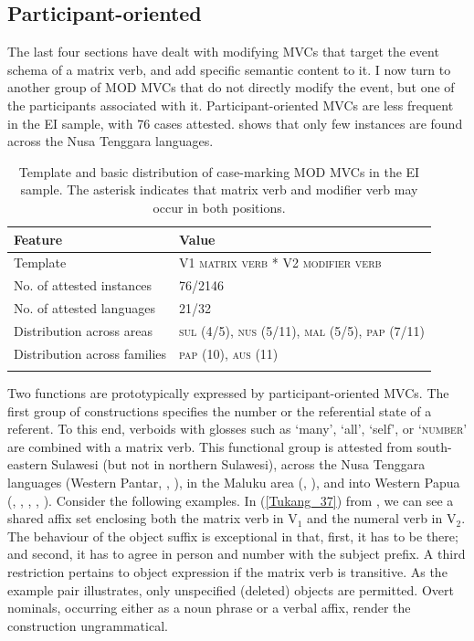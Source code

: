 \subsection{Participant-oriented}

The last four sections have dealt with modifying MVCs that target the event schema of a matrix verb, and add specific semantic content to it. I now turn to another group of MOD MVCs that do not directly modify the event, but one of the participants associated with it. Participant-oriented MVCs are less frequent in the EI sample, with 76 cases attested.  shows that only few instances are found across the Nusa Tenggara languages.

\begin{table}
\begin{tabular}{ll}
\lsptoprule
Feature&Value\tabularnewline
\midrule
Template&V1 \textsc{matrix verb} * V2 \textsc{modifier verb}\tabularnewline
No. of attested instances& 76/2146 \tabularnewline
No. of attested languages& 21/32 \tabularnewline
Distribution across areas& \textsc{sul} (4/5), \textsc{nus} (5/11), \textsc{mal} (5/5), \textsc{pap} (7/11) \tabularnewline
Distribution across families& \textsc{pap} (10), \textsc{aus} (11) \tabularnewline
\lspbottomrule
\end{tabular}
\caption[Template and basic distribution of case-marking MOD MVCs]{Template and basic distribution of case-marking MOD MVCs in the EI sample. The asterisk indicates that matrix verb and modifier verb may occur in both positions.}
\label{table:participant}
\end{table}

Two functions are prototypically expressed by participant-oriented MVCs. The first group of constructions specifies the number or the referential state of a referent. To this end, verboids with glosses such as `many', `all', `self', or `\textsc{number}' are combined with a matrix verb. This functional group is attested from south-eastern Sulawesi (but not in northern Sulawesi), across the Nusa Tenggara languages (Western Pantar, , ), in the Maluku area (, ), and into Western Papua (, , , , ). Consider the following examples. In (\ref{Tukang_37}) from , we can see a shared affix set enclosing both the matrix verb in V$_1$ and the numeral verb in V$_2$. The behaviour of the object suffix is exceptional in that, first, it has to be there; and second, it has to agree in person and number with the subject prefix. A third restriction pertains to object expression if the matrix verb is transitive. As the example pair illustrates, only unspecified (deleted) objects are permitted. Overt nominals, occurring either as a noun phrase or a verbal affix, render the construction ungrammatical.

